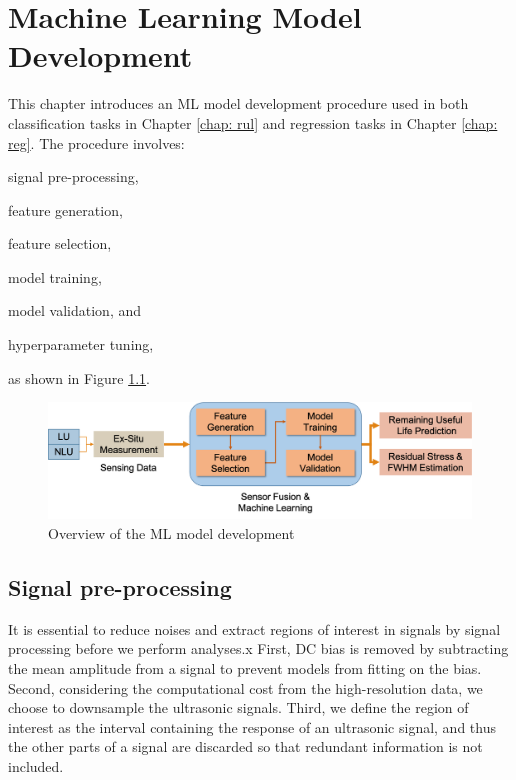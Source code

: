 \chapter{Machine Learning Model Development}
\label{chap: model}

This chapter introduces an ML model development procedure used in both classification tasks in Chapter \ref{chap: rul} and regression tasks in Chapter \ref{chap: reg}. The procedure involves:
\begin{enumerate*}[label=(\alph*)]
    \item signal pre-processing,
    \item feature generation,
    \item feature selection,
    \item model training,
    \item model validation, and
    \item hyperparameter tuning,
\end{enumerate*}
as shown in Figure \ref{fig: model development}.

\begin{figure}[tb]
    \centering
    \includegraphics[width=\linewidth]{fig/model_development.png}
    \caption{Overview of the ML model development}
    \label{fig: model development}
\end{figure}

\section{Signal pre-processing}
It is essential to reduce noises and extract regions of interest in signals by signal processing before we perform analyses.x First, DC bias is removed by subtracting the mean amplitude from a signal to prevent models from fitting on the bias. Second, considering the computational cost from the high-resolution data, we choose to downsample the ultrasonic signals. Third, we define the region of interest as the interval containing the response of an ultrasonic signal, and thus the other parts of a signal are discarded so that redundant information is not included.

